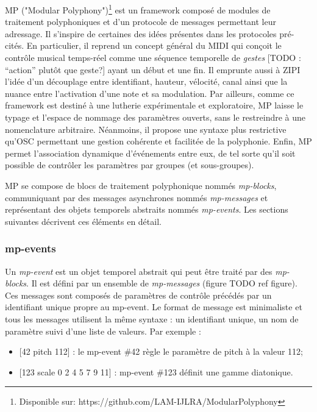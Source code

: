 MP ("Modular Polyphony")\footnote{ Disponible sur: https://github.com/LAM-IJLRA/ModularPolyphony} est un framework composé de modules de traitement polyphoniques et d'un protocole de messages permettant leur adressage. Il s'inspire de certaines des idées présentes dans les protocoles pré-cités. En particulier, il reprend un concept général du \gls{MIDI} qui conçoit le contrôle musical temps-réel comme une séquence temporelle de \textit{gestes} [TODO : ``action'' plutôt que geste?] ayant un début et une fin. Il emprunte aussi à ZIPI l'idée d'un découplage entre identifiant, hauteur, vélocité, canal ainsi que la nuance entre l'activation d'une note et sa modulation. Par ailleurs, comme ce framework est destiné à une lutherie expérimentale et exploratoire, MP laisse le typage et l'espace de nommage des paramètres ouverts, sans le restreindre à une nomenclature arbitraire. Néanmoins, il propose une syntaxe plus restrictive qu'\gls{OSC} permettant une gestion cohérente et facilitée de la polyphonie. Enfin, MP permet l'association dynamique d'événements entre eux, de tel sorte qu'il soit possible de contrôler les paramètres par groupes (et sous-groupes).

MP se compose de blocs de traitement polyphonique nommés \textit{mp-blocks}, communiquant par des messages asynchrones nommés \textit{mp-messages} et représentant des objets temporels abstraits nommés \textit{mp-events}. Les sections suivantes décrivent ces éléments en détail.

\subsubsection{mp-events}
Un \textit{mp-event} est un objet temporel abstrait qui peut être traité par des \textit{mp-blocks}. Il est défini par un ensemble de \textit{mp-messages} (figure TODO ref figure). Ces messages sont composés de paramètres de contrôle précédés par un identifiant unique propre au mp-event. Le format de message est minimaliste et tous les messages utilisent la même syntaxe : un identifiant unique, un nom de paramètre suivi d'une liste de valeurs. Par exemple :
\vspace{-1em}
\begin{itemize}[noitemsep]
	\item{[42 pitch 112] : le mp-event \#42 règle le paramètre de pitch à la valeur 112;}
	\item{[123 scale 0 2 4 5 7 9 11] : mp-event \#123 définit une gamme diatonique.}
\end{itemize}

